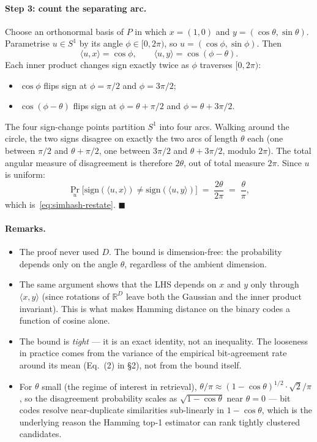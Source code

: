 \documentclass[11pt,a4paper]{article}
\begin{document}
\paragraph{Step 3: count the separating arc.} Choose an orthonormal basis of $P$ in which $x = (1, 0)$ and $y = (\cos\theta, \sin\theta)$. Parametrise $u \in S^1$ by its angle $\phi \in [0, 2\pi)$, so $u = (\cos\phi, \sin\phi)$. Then
\[
\langle u, x\rangle = \cos\phi, \qquad \langle u, y\rangle = \cos(\phi - \theta).
\]
Each inner product changes sign exactly twice as $\phi$ traverses $[0, 2\pi)$:
\begin{itemize}
  \item $\cos\phi$ flips sign at $\phi = \pi/2$ and $\phi = 3\pi/2$;
  \item $\cos(\phi - \theta)$ flips sign at $\phi = \theta + \pi/2$ and $\phi = \theta + 3\pi/2$.
\end{itemize}
The four sign-change points partition $S^1$ into four arcs. Walking around the circle, the two signs disagree on exactly the two arcs of length $\theta$ each (one between $\pi/2$ and $\theta + \pi/2$, one between $3\pi/2$ and $\theta + 3\pi/2$, modulo $2\pi$). The total angular measure of disagreement is therefore $2\theta$, out of total measure $2\pi$. Since $u$ is uniform:
\[
\Pr_u\bigl[\mathrm{sign}(\langle u, x\rangle) \neq \mathrm{sign}(\langle u, y\rangle)\bigr]
\;=\; \frac{2\theta}{2\pi} \;=\; \frac{\theta}{\pi},
\]
which is~\eqref{eq:simhash-restate}. \hfill$\blacksquare$

\paragraph{Remarks.}
\begin{itemize}
  \item The proof never used $D$. The bound is dimension-free: the probability depends only on the angle $\theta$, regardless of the ambient dimension.
  \item The same argument shows that the LHS depends on $x$ and $y$ only through $\langle x, y\rangle$ (since rotations of $\mathbb{R}^D$ leave both the Gaussian and the inner product invariant). This is what makes Hamming distance on the binary codes a function of cosine alone.
  \item The bound is \emph{tight} --- it is an exact identity, not an inequality. The looseness in practice comes from the variance of the empirical bit-agreement rate around its mean (Eq.~(2) in \S2), not from the bound itself.
  \item For $\theta$ small (the regime of interest in retrieval), $\theta/\pi \approx (1 - \cos\theta)^{1/2} \cdot \sqrt{2}/\pi$, so the disagreement probability scales as $\sqrt{1 - \cos\theta}$ near $\theta = 0$ --- bit codes resolve near-duplicate similarities sub-linearly in $1 - \cos\theta$, which is the underlying reason the Hamming top-1 estimator can rank tightly clustered candidates.
\end{itemize}
\end{document}
